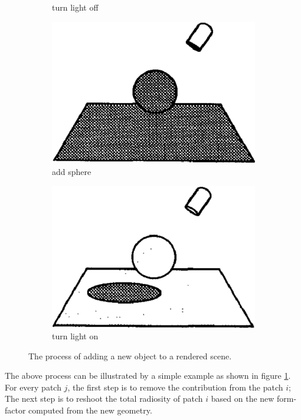 \begin{figure}
\begin{subfigure}[b]{0.243\textwidth}
		\caption{turn light off}
	\end{subfigure}
	\begin{subfigure}[b]{0.243\textwidth}
		\includegraphics{graphics/gi/path-36-3}
		\caption{add sphere}
	\end{subfigure}
	\begin{subfigure}[b]{0.243\textwidth}
		\includegraphics{graphics/gi/path-36-4}
		\caption{turn light on}
	\end{subfigure}
	\caption{The process of adding a new object to a rendered scene.}	
	\label{f:changing-scene-grometry}
\end{figure}

The above process can be illustrated by a simple example as shown in figure \ref{f:changing-scene-grometry}. For every patch $j$, the first step is to remove the contribution from the patch $i$; The next step is to reshoot the total radiosity of patch $i$ based on the new form-factor computed from the new geometry.



